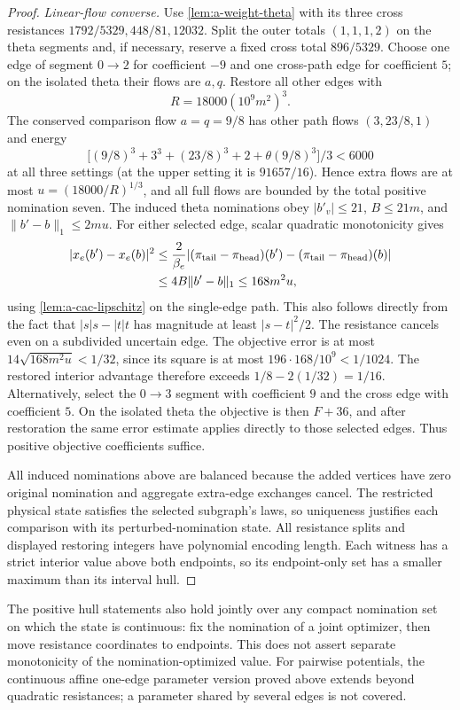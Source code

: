 \begin{proof}
\emph{Linear-flow converse.}
Use \cref{lem:a-weight-theta} with its three cross resistances
$1792/5329,448/81,12032$. Split the outer totals $(1,1,1,2)$ on the theta
segments and, if necessary, reserve a fixed cross total $896/5329$.
Choose one edge of segment $0\to2$ for coefficient $-9$ and one
cross-path edge for coefficient $5$; on the isolated theta their flows
are $a,q$. Restore all other edges with
\[
 R=18000(10^9m^2)^3.
\]
The conserved comparison flow $a=q=9/8$ has other path flows
$(3,23/8,1)$ and energy
\[
 \bigl[(9/8)^3+3^3+(23/8)^3+2+\theta(9/8)^3\bigr]/3<6000
\]
at all three settings (at the upper setting it is $91657/16$).
Hence extra flows are at most $u=(18000/R)^{1/3}$, and all full flows
are bounded by the total positive nomination seven.
The induced theta nominations obey $|b'_v|\le21$,
$B\le21m$, and $\|b'-b\|_1\le2mu$.
For either selected edge, scalar quadratic monotonicity gives
\[
 \begin{split}
 |x_e(b')-x_e(b)|^2
 &\le\frac2{\beta_e}
   |(\pi_{\rm tail}-\pi_{\rm head})(b')
        -(\pi_{\rm tail}-\pi_{\rm head})(b)|\\
 &\le4B\|b'-b\|_1\le168m^2u,
 \end{split}
\]
using \cref{lem:a-cac-lipschitz} on the single-edge path. This also
follows directly from the fact that $|s|s-|t|t$ has magnitude at least
$|s-t|^2/2$. The resistance cancels even on a subdivided uncertain edge.
The objective error is at most $14\sqrt{168m^2u}<1/32$, since its
square is at most $196\cdot168/10^9<1/1024$.
The restored interior advantage therefore exceeds $1/8-2(1/32)=1/16$.
Alternatively, select the $0\to3$ segment with coefficient $9$ and the
cross edge with coefficient $5$. On the isolated theta the objective
is then $F+36$, and after restoration the same error estimate applies
directly to those selected edges. Thus positive objective coefficients
suffice.

All induced nominations above are balanced because the added vertices
have zero original nomination and aggregate extra-edge exchanges cancel.
The restricted physical state satisfies the selected subgraph's laws,
so uniqueness justifies each comparison with its perturbed-nomination
state. All resistance splits and displayed restoring integers have
polynomial encoding length. Each witness has a strict interior value
above both endpoints, so its endpoint-only set has a smaller maximum
than its interval hull.
\end{proof}

The positive hull statements also hold jointly over any compact
nomination set on which the state is continuous: fix the nomination
of a joint optimizer, then move resistance coordinates to endpoints.
This does not assert separate monotonicity of the nomination-optimized
value. For pairwise potentials, the continuous affine one-edge parameter
version proved above extends beyond quadratic resistances; a parameter
shared by several edges is not covered.

